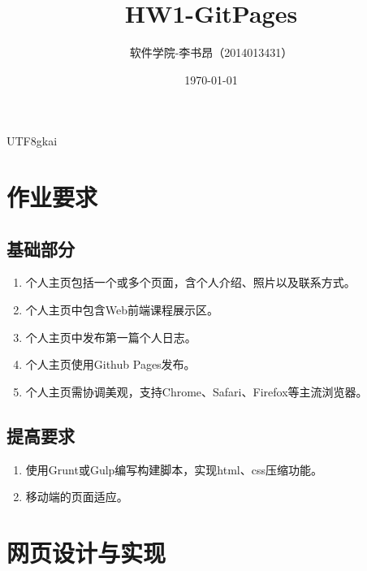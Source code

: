 \documentclass{article}
\begin{document}
\begin{CJK}{UTF8}{gkai} %

\renewcommand{\abstractname}{摘 \qquad 要}
\renewcommand{\contentsname}{\center 目\qquad\qquad录}
\renewcommand{\listfigurename}{图 \quad 示 \quad 目 \quad 录}
\renewcommand{\listtablename}{表 \quad 格 \quad 目 \quad 录}
\renewcommand{\appendixname}{附录}
\renewcommand{\refname}{\center 参 \quad 考 \quad 文 \quad 献}
\renewcommand{\indexname}{\center 索 \qquad 引}
\renewcommand{\figurename}{图}
\renewcommand{\tablename}{表}

\title{HW1-GitPages}
\author{软件学院-李书昂（2014013431）}
\date{\today}
\maketitle

\section{作业要求}
	\subsection{基础部分}
		\begin{enumerate}
		\item 个人主页包括一个或多个页面，含个人介绍、照片以及联系方式。
		\item 个人主页中包含Web前端课程展示区。
		\item 个人主页中发布第一篇个人日志。
		\item 个人主页使用Github Pages发布。
		\item 个人主页需协调美观，支持Chrome、Safari、Firefox等主流浏览器。
		\end{enumerate}
	\subsection{提高要求}
		\begin{enumerate}
		\item 使用Grunt或Gulp编写构建脚本，实现html、css压缩功能。
		\item 移动端的页面适应。
		\end{enumerate}

\section{网页设计与实现}

\end{CJK}
\end{document}
